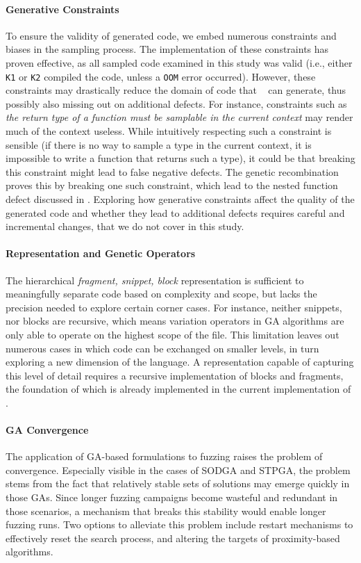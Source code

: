 \paragraph{Generative Constraints}
To ensure the validity of generated code, we embed
numerous constraints and biases in the sampling process.
The implementation of these constraints has proven effective,
as all sampled code examined in this study was valid (i.e., either \texttt{K1} or \texttt{K2}
compiled the code, unless a \texttt{OOM} error occurred).
However, these constraints may drastically reduce the domain of code that \kf~ can generate,
thus possibly also missing out on additional defects.
For instance, constraints such as \textit{the return type of a function must be samplable in the current context}
may render much of the context useless.
While intuitively respecting such a constraint is sensible
(if there is no way to sample a type in the current context, it is impossible to write a function
that returns such a type), it could be that breaking this constraint
might lead to false negative defects.
The genetic recombination proves this by breaking one such constraint, which
lead to the nested function defect discussed in .
Exploring how generative constraints affect the quality of the generated code and whether
they lead to additional defects requires careful and incremental changes, that we do not cover in this study.

\paragraph{Representation and Genetic Operators}
The hierarchical \textit{fragment, snippet, block} representation
is sufficient to meaningfully separate code
based on complexity and scope, but lacks the precision needed to
explore certain corner cases.
For instance, neither snippets, nor blocks are recursive,
which means variation operators in \gls{GA} algorithms
are only able to operate on the highest scope
of the file.
This limitation leaves out numerous cases in which
code can be exchanged on smaller levels, in turn exploring a new dimension of the language.
A representation capable of capturing this level of detail
requires a recursive implementation of blocks and fragments,
the foundation of which is already implemented in the current implementation of \kf.

\paragraph{\gls{GA} Convergence}
The application of \gls{GA}-based formulations to fuzzing
raises the problem of convergence.
Especially visible in the cases of \gls{SODGA} and \gls{STPGA},
the problem stems from the fact that relatively stable sets of solutions
may emerge quickly in those \gls{GA}s.
Since longer fuzzing campaigns become wasteful and redundant in those
scenarios, a mechanism that breaks this stability would enable
longer fuzzing runs.
Two options to alleviate this problem include restart mechanisms to effectively reset the search process,
and altering the targets of proximity-based algorithms.


